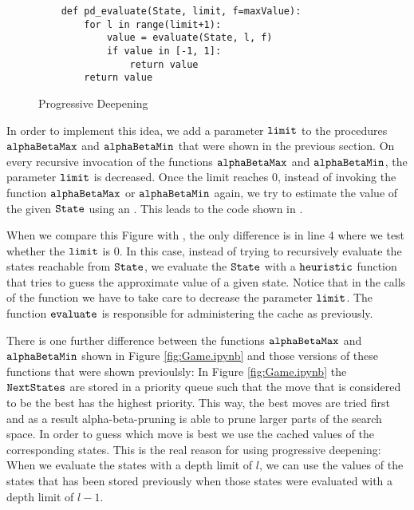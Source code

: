 \begin{figure}[!ht]
\centering
\begin{verbatim}
    def pd_evaluate(State, limit, f=maxValue):
        for l in range(limit+1):
            value = evaluate(State, l, f)
            if value in [-1, 1]:
                return value
        return value
\end{verbatim}
\caption{Progressive Deepening}
\label{fig:Game.ipynb:pd_evaluate}
\end{figure}
\FloatBarrier


In order to implement this idea, we add a parameter $\texttt{limit}$ to the procedures $\texttt{alphaBetaMax}$
and $\texttt{alphaBetaMin}$ that were shown in the previous section.  On
every recursive invocation of the functions $\texttt{alphaBetaMax}$ and $\texttt{alphaBetaMin}$, the parameter
$\texttt{limit}$ is decreased. 
Once the limit reaches $0$, instead of invoking the function $\texttt{alphaBetaMax}$ or $\texttt{alphaBetaMin}$
again, we try to estimate the value of the given $\texttt{State}$ using an .  This
leads to the code shown in . 

When we compare this Figure with , the only difference is in line 4
where we test whether the $\texttt{limit}$ is $0$.  In this case, instead of trying to recursively evaluate the
states reachable from $\texttt{State}$, we evaluate the $\texttt{State}$ with a $\texttt{heuristic}$ function
that tries to guess the approximate value of a given state.
Notice that in the calls of the function  we have to take care to decrease the parameter
$\texttt{limit}$.  The function $\texttt{evaluate}$ is responsible for administering the cache as previously.

There is one further difference between the functions $\texttt{alphaBetaMax}$ and $\texttt{alphaBetaMin}$ shown in
Figure \ref{fig:Game.ipynb} and those versions of these functions that were shown previoulsly:
In Figure \ref{fig:Game.ipynb} the $\texttt{NextStates}$ are stored in a priority queue such that the move that
is considered to be the best has the highest priority.  This way, the best moves are tried first and as a
result alpha-beta-pruning is able to prune larger parts of the search space.
In order to guess which move is best we use the cached values of the corresponding states.  This is the real
reason for using progressive deepening:  When we evaluate the states with a depth limit of $l$, we can use the
values of the states that has been stored previously when those states were evaluated with a depth limit of
$l-1$. 

